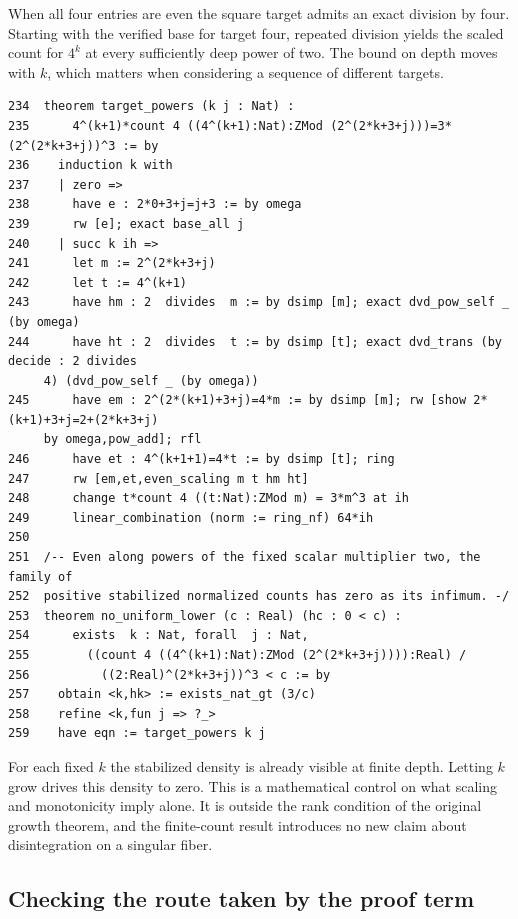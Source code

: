 \documentclass[12pt,letterpaper]{article}
\begin{document}
When all four entries are even the square target admits an exact division by four. Starting with the verified base for target four, repeated division yields the scaled count for $4^k$ at every sufficiently deep power of two. The bound on depth moves with $k$, which matters when considering a sequence of different targets.
\par
{\fontsize{9.2}{11.2}\selectfont\begin{verbatim}
234  theorem target_powers (k j : Nat) :
235      4^(k+1)*count 4 ((4^(k+1):Nat):ZMod (2^(2*k+3+j)))=3*(2^(2*k+3+j))^3 := by
236    induction k with
237    | zero =>
238      have e : 2*0+3+j=j+3 := by omega
239      rw [e]; exact base_all j
240    | succ k ih =>
241      let m := 2^(2*k+3+j)
242      let t := 4^(k+1)
243      have hm : 2  divides  m := by dsimp [m]; exact dvd_pow_self _ (by omega)
244      have ht : 2  divides  t := by dsimp [t]; exact dvd_trans (by decide : 2 divides
     4) (dvd_pow_self _ (by omega))
245      have em : 2^(2*(k+1)+3+j)=4*m := by dsimp [m]; rw [show 2*(k+1)+3+j=2+(2*k+3+j)
     by omega,pow_add]; rfl
246      have et : 4^(k+1+1)=4*t := by dsimp [t]; ring
247      rw [em,et,even_scaling m t hm ht]
248      change t*count 4 ((t:Nat):ZMod m) = 3*m^3 at ih
249      linear_combination (norm := ring_nf) 64*ih
250
251  /-- Even along powers of the fixed scalar multiplier two, the family of
252  positive stabilized normalized counts has zero as its infimum. -/
253  theorem no_uniform_lower (c : Real) (hc : 0 < c) :
254      exists  k : Nat, forall  j : Nat,
255        ((count 4 ((4^(k+1):Nat):ZMod (2^(2*k+3+j)))):Real) /
256          ((2:Real)^(2*k+3+j))^3 < c := by
257    obtain <k,hk> := exists_nat_gt (3/c)
258    refine <k,fun j => ?_>
259    have eqn := target_powers k j
\end{verbatim}}
For each fixed $k$ the stabilized density is already visible at finite depth. Letting $k$ grow drives this density to zero. This is a mathematical control on what scaling and monotonicity imply alone. It is outside the rank condition of the original growth theorem, and the finite-count result introduces no new claim about disintegration on a singular fiber.
\clearpage{}\subsection*{Checking the route taken by the proof term}\label{extract-EndpointAudit42}
\end{document}
